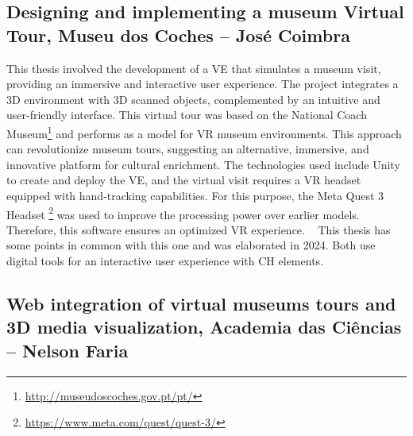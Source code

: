 \subsection{Designing and implementing a museum Virtual Tour, Museu dos Coches – José Coimbra}
\label{sec:thesis2_nova}

This thesis involved the development of a \gls{VE} that simulates a museum visit, providing an immersive and interactive user experience. The project integrates a \gls{3D} environment 
with \gls{3D} scanned objects, complemented by an intuitive and user-friendly interface. 
This virtual tour was based on the National Coach Museum\footnote{\url{http://museudoscoches.gov.pt/pt/}} and performs as a model for \gls{VR} museum environments. This approach can revolutionize 
museum tours, suggesting an alternative, immersive, and innovative platform for cultural enrichment. 
The technologies used include Unity to create and deploy the \gls{VE}, and the virtual visit requires a \gls{VR} headset equipped with hand-tracking capabilities. For this purpose, 
the Meta Quest 3 Headset \footnote{\url{https://www.meta.com/quest/quest-3/}} was used to improve the processing power over earlier models. Therefore, this software ensures an optimized \gls{VR} experience. ~\cite{tese_tourCoimbra2024}
This thesis has some points in common with this one and was elaborated in 2024. Both use digital tools for an interactive user experience with \gls{CH} elements.


\subsection{Web integration of virtual museums tours and \gls{3D} media visualization, Academia das Ciências – Nelson Faria}
\label{sec:thesis3_nova}

